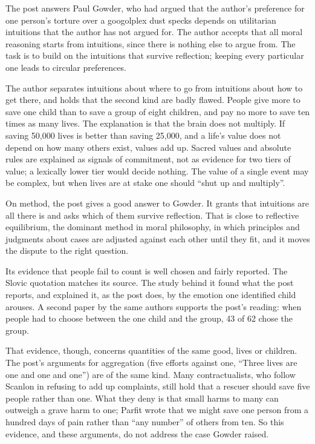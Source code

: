 \begin{afterword}
\summaryhead

The post answers Paul Gowder, who had argued that the author's preference for one person's torture over a googolplex dust specks depends on utilitarian intuitions that the author has not argued for. The author accepts that all moral reasoning starts from intuitions, since there is nothing else to argue from. The task is to build on the intuitions that survive reflection; keeping every particular one leads to circular preferences.

The author separates intuitions about where to go from intuitions about how to get there, and holds that the second kind are badly flawed. People give more to save one child than to save a group of eight children, and pay no more to save ten times as many lives. The explanation is that the brain does not multiply. If saving 50,000 lives is better than saving 25,000, and a life's value does not depend on how many others exist, values add up. Sacred values and absolute rules are explained as signals of commitment, not as evidence for two tiers of value; a lexically lower tier would decide nothing. The value of a single event may be complex, but when lives are at stake one should ``shut up and multiply''.

\responsehead

On method, the post gives a good answer to Gowder. It grants that intuitions are all there is and asks which of them survive reflection. That is close to reflective equilibrium, the dominant method in moral philosophy, in which principles and judgments about cases are adjusted against each other until they fit, and it moves the dispute to the right question.

Its evidence that people fail to count is well chosen and fairly reported. The Slovic quotation matches its source. The study behind it found what the post reports, and explained it, as the post does, by the emotion one identified child arouses. A second paper by the same authors supports the post's reading: when people had to choose between the one child and the group, 43 of 62 chose the group.

That evidence, though, concerns quantities of the same good, lives or children. The post's arguments for aggregation (five efforts against one, ``Three lives are one and one and one'') are of the same kind. Many contractualists, who follow Scanlon in refusing to add up complaints, still hold that a rescuer should save five people rather than one. What they deny is that small harms to many can outweigh a grave harm to one; Parfit wrote that we might save one person from a hundred days of pain rather than ``any number'' of others from ten. So this evidence, and these arguments, do not address the case Gowder raised.


\end{afterword}
